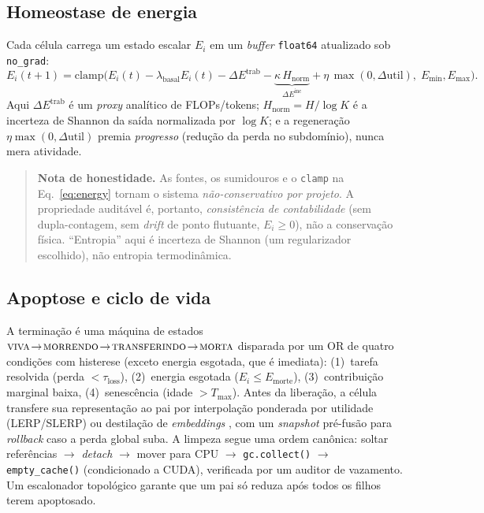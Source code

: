 \documentclass[11pt]{article}
\begin{document}
\subsection{Homeostase de energia}
\label{sec:energy}
Cada célula carrega um estado escalar $E_i$ em um \emph{buffer} \texttt{float64}
atualizado sob \texttt{no\_grad}:
\begin{equation}
E_i(t{+}1)=\mathrm{clamp}\!\Big(
E_i(t) - \lambda_{\text{basal}} E_i(t) - \Delta E^{\text{trab}}
- \underbrace{\kappa\,H_{\text{norm}}}_{\Delta E^{\text{inc}}}
+ \eta\,\max(0,\Delta \mathrm{util}),\;
E_{\min}, E_{\max}\Big).
\label{eq:energy}
\end{equation}
Aqui $\Delta E^{\text{trab}}$ é um \emph{proxy} analítico de FLOPs/tokens;
$H_{\text{norm}}=H/\log K$ é a incerteza de Shannon da saída normalizada por
$\log K$; e a regeneração $\eta\max(0,\Delta\mathrm{util})$ premia \emph{progresso}
(redução da perda no subdomínio), nunca mera atividade.

\begin{quotation}
\noindent\textbf{Nota de honestidade.} As fontes, os sumidouros e o \texttt{clamp}
na Eq.~\eqref{eq:energy} tornam o sistema \emph{não-conservativo por projeto}. A
propriedade auditável é, portanto, \emph{consistência de contabilidade} (sem
dupla-contagem, sem \emph{drift} de ponto flutuante, $E_i\ge0$), não a conservação
física. ``Entropia'' aqui é incerteza de Shannon (um regularizador escolhido), não
entropia termodinâmica.
\end{quotation}

\subsection{Apoptose e ciclo de vida}
A terminação é uma máquina de estados
$\textsc{viva}\!\to\!\textsc{morrendo}\!\to\!\textsc{transferindo}\!\to\!\textsc{morta}$
disparada por um OR de quatro condições com histerese (exceto energia esgotada,
que é imediata): (1)~tarefa resolvida (perda $<\tau_{\text{loss}}$), (2)~energia
esgotada ($E_i\le E_{\text{morte}}$), (3)~contribuição marginal baixa,
(4)~senescência (idade $>T_{\max}$). Antes da liberação, a célula transfere sua
representação ao pai por interpolação ponderada por utilidade (LERP/SLERP) ou
destilação de \emph{embeddings} \cite{hinton2015distill}, com um \emph{snapshot}
pré-fusão para \emph{rollback} caso a perda global suba. A limpeza segue uma ordem
canônica: soltar referências $\to$ \emph{detach} $\to$ mover para CPU $\to$
\texttt{gc.collect()} $\to$ \texttt{empty\_cache()} (condicionado a CUDA),
verificada por um auditor de vazamento. Um escalonador topológico garante que um
pai só reduza após todos os filhos terem apoptosado.
\end{document}
